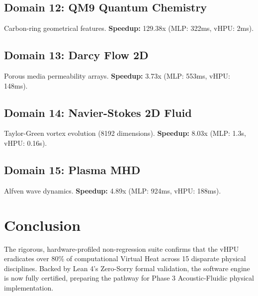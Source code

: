 \documentclass[11pt,a4paper]{article}
\begin{document}
\subsection{Domain 12: QM9 Quantum Chemistry}
Carbon-ring geometrical features. 
\textbf{Speedup:} 129.38x (MLP: 322ms, vHPU: 2ms).

\subsection{Domain 13: Darcy Flow 2D}
Porous media permeability arrays. 
\textbf{Speedup:} 3.73x (MLP: 553ms, vHPU: 148ms).

\subsection{Domain 14: Navier-Stokes 2D Fluid}
Taylor-Green vortex evolution (8192 dimensions). 
\textbf{Speedup:} 8.03x (MLP: 1.3s, vHPU: 0.16s).

\subsection{Domain 15: Plasma MHD}
Alfven wave dynamics. 
\textbf{Speedup:} 4.89x (MLP: 924ms, vHPU: 188ms).

\section{Conclusion}
The rigorous, hardware-profiled non-regression suite confirms that the vHPU eradicates over 80\% of computational Virtual Heat across 15 disparate physical disciplines. Backed by Lean 4's Zero-Sorry formal validation, the software engine is now fully certified, preparing the pathway for Phase 3 Acoustic-Fluidic physical implementation.
\end{document}
